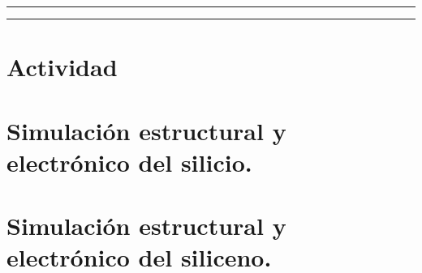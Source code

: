 







\tableofcontents			%

\begin{center}
	\rule[0mm]{150mm}{0.1mm}		%
\end{center}
	
	
\begin{abstract}		%
  
\end{abstract}
	
\begin{center}
	\rule[0mm]{150mm}{0.1mm}
\end{center}

\section{Actividad}
	

\section{Simulación estructural y electrónico del ​silicio​.}
	

\section{Simulación estructural y electrónico del ​siliceno​.}
	


\nocite{*}


